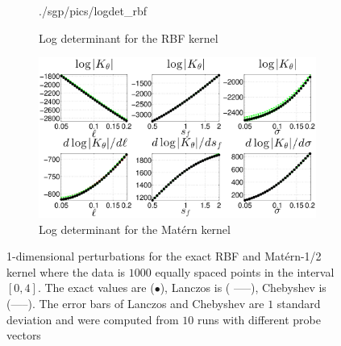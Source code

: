 \begin{figure}[ht]
\begin{center}
\begin{subfigure}{0.46\textwidth}
      {./sgp/pics/logdet_rbf}
      \caption{Log determinant for the RBF kernel}\label{fig:1dpert_c}
    \end{subfigure}
    \begin{subfigure}{0.46\textwidth}
      \centering
      \includegraphics[width=\textwidth,trim=3.5cm 0cm 3.5cm 0cm,clip]
      {./sgp/pics/logdet_Matern}
      \caption{Log determinant for the Mat\'ern kernel}\label{fig:1dpert_d}
    \end{subfigure}
    \caption{1\hyp{}dimensional perturbations for the exact RBF and 
    Mat\'ern\hyp{}1/2 kernel where the data is $1000$ equally spaced points in
    the interval $[0,4]$. The exact values are ($\bullet$), Lanczos is ({
    \color{red}-----}), Chebyshev is ({\color{green}-----}). The error bars of
    Lanczos and Chebyshev are $1$ standard deviation and were computed from $10$
    runs with different probe vectors}\label{fig:1dpert}
  \end{center}
\end{figure}

